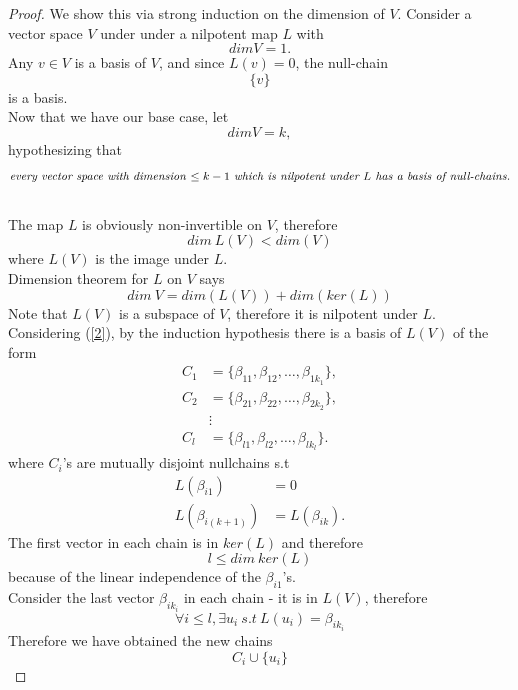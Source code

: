 \documentclass{article}
\theoremstyle{definition}
\begin{document}
\begin{proof}
    We show this via strong induction on the dimension of $V$.
    Consider a vector space $V$ under under a nilpotent map $L$ with $$dimV=1.$$Any $v\in V$ is a basis of $V$, and since $L(v)=0$, the null-chain $$\{v\}$$is a basis.\\
    Now that we have our base case, let $$dimV=k,$$hypothesizing that $$\text{\textit{every vector space with dimension} $\leq k-1$ \textit{which is nilpotent under $L$ has a basis of null-chains.}}$$\\
    The map $L$ is obviously non-invertible on $V$, therefore
    \begin{equation}\label{2}
        dim\ L(V)<dim(V)
    \end{equation}
    where $L(V)$ is the image under $L$. \\
    Dimension theorem for $L$ on $V$ says 
    \begin{equation}
        dim \ V=dim(L(V))+ dim(ker(L))
    \end{equation}
    Note that $L(V)$ is a subspace of $V$, therefore it is nilpotent under $L$. Considering (\ref{2}), by the induction hypothesis there is a basis of $L(V)$ of the form \[
\begin{aligned}
C_1 &= \{\beta_{11}, \beta_{12}, \ldots, \beta_{1k_1}\},\\
C_2 &= \{\beta_{21}, \beta_{22}, \ldots, \beta_{2k_2}\},\\
&\vdots\\
C_l &= \{\beta_{l1}, \beta_{l2}, \ldots, \beta_{lk_l}\}.
\end{aligned}
\]
where $C_i$'s are mutually disjoint nullchains s.t 
\[
\begin{aligned}
L(\beta_{i1}) &= 0\\
L(\beta_{i(k+1)}) &= L(\beta_{ik}).
\end{aligned}
\]
The first vector in each chain is in $ker(L)$ and therefore
\begin{equation}
    l\leq dim \ ker(L)
\end{equation}
because of the linear independence of the $\beta_{i1}$'s.\\
Consider the last vector $\beta_{ik_i}$ in each chain - it is in $L(V)$, therefore
\begin{equation}
    \forall i\leq l, \exists u_i\ s.t \ L(u_i)=\beta_{ik_i}
\end{equation}
Therefore we have obtained the new chains
\begin{equation}\label{newc}
    C_i\cup\{u_i\}

\end{equation}
\end{proof}
\end{document}
